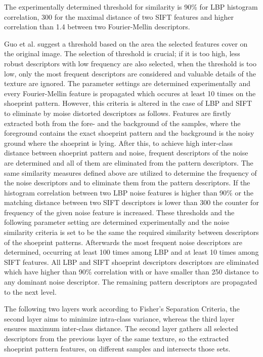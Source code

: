 \documentclass[draft,final]{vutinfth} %
\begin{document}
The experimentally determined threshold for similarity is  90\% for LBP histogram correlation, 300 for the maximal distance of two SIFT features and higher correlation than 1.4 between two Fourier-Mellin descriptors.
\par
Guo et al. \cite{guo2012discriminative} suggest a threshold based on the area the selected features cover on the original image.
The selection of threshold is crucial; if it is too high, less robust descriptors with low frequency are also selected, when the threshold is too low, only the most frequent descriptors are considered and valuable details of the texture are ignored.
The parameter settings are determined experimentally and every Fourier-Mellin feature is propagated which occures at least 10 times on the shoeprint pattern.
However, this criteria is altered in the case of LBP and SIFT to eliminate by moise distorted descriptors as follows.
Features are firstly extracted both from the fore- and the background of the samples, where the foreground contains the exact shoeprint pattern and the background is the noisy ground where the shoeprint is lying. 
After this, to achieve high inter-class distance between shoeprint pattern and noise, frequent descriptors of the noise are determined and all of them are eliminated from the pattern descriptors.
The same similarity measures defined above are utilized to determine the frequency of the noise descriptors and to eliminate them from the pattern descriptors.
If the histogram correlation between two LBP noise features is higher than 90\% or the matching distance between two SIFT descriptors is lower than 300 the counter for frequency of the given noise feature is increased.
These thresholds and the following parameter setting are determined experimentally and the noise similarity criteria is set to be the same the required similarity between descriptors of the shoeprint patterns.
Afterwards the most frequent noise descriptors are determined, occurring at least 100 times among LBP and at least 10 times among SIFT features.
All LBP and SIFT shoeprint descriptors descriptors are eliminated which have higher than 90\% correlation with or have smaller than 250 distance to any dominant noise descriptor.
The remaining pattern descriptors are propagated to the next level. 
\par
The following two layers work according to Fisher's Separation Criteria, the second layer aims to minimize intra-class variance, whereas the third layer ensures maximum inter-class distance. 
The second layer gathers all selected descriptors from the previous layer of the same texture, so the extracted shoeprint pattern features, on different samples and intersects those sets.
\end{document}
